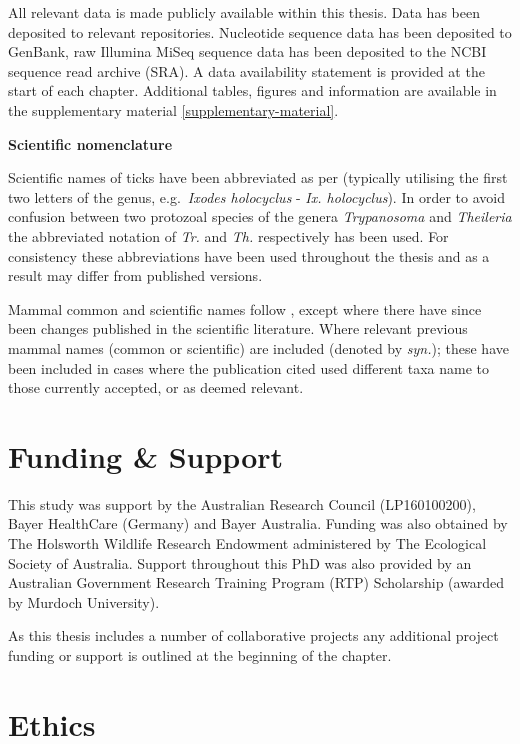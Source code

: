 \documentclass[a4paper, nobind]{templates/ociamthesis}
\begin{document}
All relevant data is made publicly available within this thesis.
Data has been deposited to relevant repositories.
Nucleotide sequence data has been deposited to GenBank, raw Illumina MiSeq sequence data has been deposited to the NCBI sequence read archive (SRA).
A data availability statement is provided at the start of each chapter.
Additional tables, figures and information are available in the supplementary material \ref{supplementary-material}.

\textbf{Scientific nomenclature}

Scientific names of ticks have been abbreviated as per \textcite{dantas-torresStandardizationAbbreviationsGenus2008} (typically utilising the first two letters of the genus, e.g.~\emph{Ixodes holocyclus} - \emph{Ix. holocyclus}).
In order to avoid confusion between two protozoal species of the genera \emph{Trypanosoma} and \emph{Theileria} the abbreviated notation of \emph{Tr.} and \emph{Th.} respectively has been used.
For consistency these abbreviations have been used throughout the thesis and as a result may differ from published versions.

Mammal common and scientific names follow \textcite{jacksonTaxonomyAustralianMammals2015}, except where there have since been changes published in the scientific literature.
Where relevant previous mammal names (common or scientific) are included (denoted by \emph{syn.}); these have been included in cases where the publication cited used different taxa name to those currently accepted, or as deemed relevant.

\hypertarget{funding-support}{%
\section*{Funding \& Support}\label{funding-support}}

This study was support by the Australian Research Council (LP160100200), Bayer HealthCare (Germany) and Bayer Australia.
Funding was also obtained by The Holsworth Wildlife Research Endowment administered by The Ecological Society of Australia.
Support throughout this PhD was also provided by an Australian Government Research Training Program (RTP) Scholarship (awarded by Murdoch University).

As this thesis includes a number of collaborative projects any additional project funding or support is outlined at the beginning of the chapter.

\hypertarget{ethics}{%
\section*{Ethics}\label{ethics}}
\end{document}
